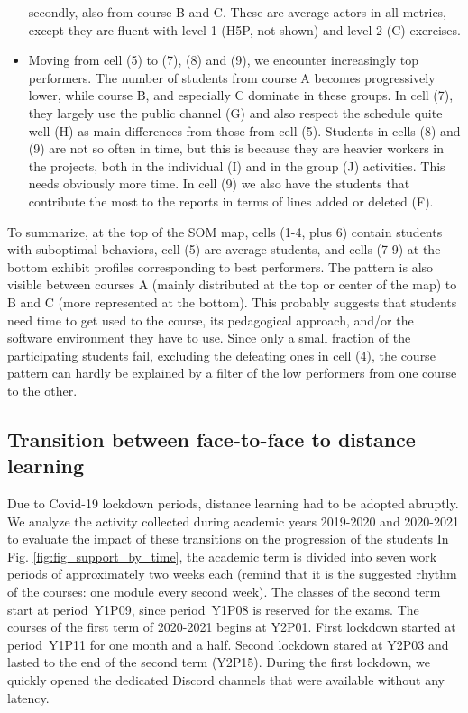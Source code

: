 \documentclass{aims}
\theoremstyle{definition}
\begin{document}
\begin{itemize}
  secondly, also from course B and C. These are average actors in all
  metrics, except they are fluent with level 1 (H5P, not shown) and
  level 2 (C) exercises.
\item
  Moving from cell (5) to (7), (8) and (9), we encounter increasingly
  top performers. The number of students from course A becomes
  progressively lower, while course B, and especially C dominate in
  these groups. In cell (7), they largely use the public channel (G) and
  also respect the schedule quite well (H) as main differences from
  those from cell (5). Students in cells (8) and (9) are not so often in
  time, but this is because they are heavier workers in the projects,
  both in the individual (I) and in the group (J) activities. This needs
  obviously more time. In cell (9) we also have the students that
  contribute the most to the reports in terms of lines added or deleted
  (F).
\end{itemize}

To summarize, at the top of the SOM map, cells (1-4, plus 6) contain
students with suboptimal behaviors, cell (5) are average students, and
cells (7-9) at the bottom exhibit profiles corresponding to best
performers. The pattern is also visible between courses A (mainly
distributed at the top or center of the map) to B and C (more
represented at the bottom). This probably suggests that students need
time to get used to the course, its pedagogical approach, and/or the
software environment they have to use. Since only a small fraction of
the participating students fail, excluding the defeating ones in cell
(4), the course pattern can hardly be explained by a filter of the low
performers from one course to the other.

\hypertarget{transition-between-face-to-face-to-distance-learning}{%
\subsection{Transition between face-to-face to distance
learning}\label{transition-between-face-to-face-to-distance-learning}}

Due to Covid-19 lockdown periods, distance learning had to be adopted
abruptly. We analyze the activity collected during academic years
2019-2020 and 2020-2021 to evaluate the impact of these transitions on
the progression of the students In Fig. \ref {fig:fig_support_by_time},
the academic term is divided into seven work periods of approximately
two weeks each (remind that it is the suggested rhythm of the courses:
one module every second week). The classes of the second term start at
period~Y1P09, since period~Y1P08 is reserved for the exams. The courses
of the first term of 2020-2021 begins at Y2P01. First lockdown started
at period~Y1P11 for one month and a half. Second lockdown stared at
Y2P03 and lasted to the end of the second term (Y2P15). During the first
lockdown, we quickly opened the dedicated Discord channels that were
available without any latency.
\end{document}
